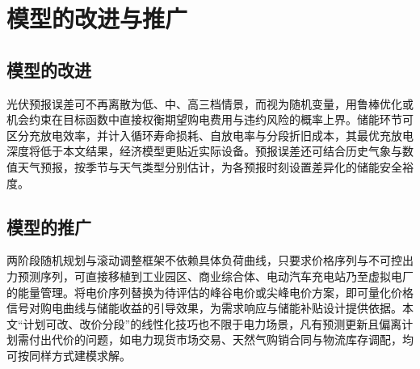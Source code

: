 
\section{模型的改进与推广}

\subsection{模型的改进}

光伏预报误差可不再离散为低、中、高三档情景，而视为随机变量，用鲁棒优化或机会约束在目标函数中直接权衡期望购电费用与违约风险的概率上界。储能环节可区分充放电效率，并计入循环寿命损耗、自放电率与分段折旧成本，其最优充放电深度将低于本文结果，经济模型更贴近实际设备。预报误差还可结合历史气象与数值天气预报，按季节与天气类型分别估计，为各预报时刻设置差异化的储能安全裕度。

\subsection{模型的推广}

两阶段随机规划与滚动调整框架不依赖具体负荷曲线，只要求价格序列与不可控出力预测序列，可直接移植到工业园区、商业综合体、电动汽车充电站乃至虚拟电厂的能量管理。将电价序列替换为待评估的峰谷电价或尖峰电价方案，即可量化价格信号对购电曲线与储能收益的引导效果，为需求响应与储能补贴设计提供依据。本文“计划可改、改价分段”的线性化技巧也不限于电力场景，凡有预测更新且偏离计划需付出代价的问题，如电力现货市场交易、天然气购销合同与物流库存调配，均可按同样方式建模求解。
